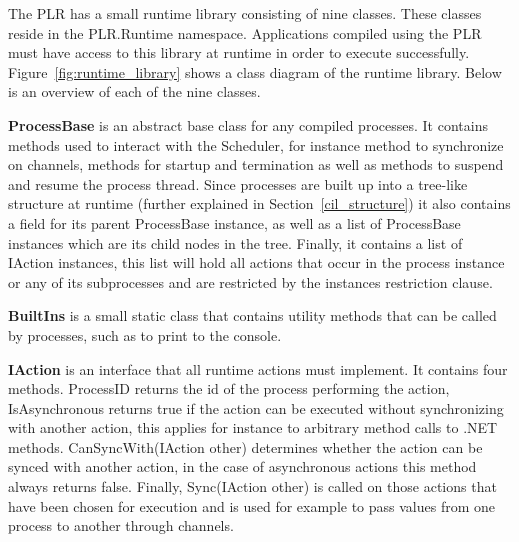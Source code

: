	The PLR has a small runtime library consisting of nine classes. These classes
	reside in the \textsf{PLR.Runtime} namespace. Applications
	compiled using the PLR must have access to this library at runtime in order
	to execute successfully. Figure~\ref{fig:runtime_library} shows a class 
	diagram of the runtime library. Below is an overview of each of the
	nine classes.

	\textbf{ProcessBase} is an abstract base class for any compiled processes.
	It contains methods used to interact with the \textsf{Scheduler},
	for instance method to synchronize on channels, methods for startup and
	termination as well as methods to suspend and resume the process thread.
	Since processes are built up into a tree-like structure at runtime (further 
	explained in Section~\ref{cil_structure}) it also contains a field for its 
	parent \textsf{ProcessBase} instance, as well as a list of 
	\textsf{ProcessBase} instances which are its child nodes in the tree. Finally, 
	it contains a list of \textsf{IAction} instances, this list will hold all 
	actions that occur in the process instance or any of its subprocesses and are 
	restricted by the instances restriction clause.
	
	\textbf{BuiltIns} is a small static class that contains utility methods
	that can be called by processes, such as to print to the console.
	
	\textbf{IAction} is an interface that all runtime actions must implement.
	It contains four methods. \textsf{ProcessID} returns the id of the
	process performing the action, \textsf{IsAsynchronous} returns true if
	the action can be executed without synchronizing with another action, 
	this applies for instance to arbitrary method calls to .NET methods.
	\textsf{CanSyncWith(IAction other)} determines whether the action can be 
	synced with another action, in the case of asynchronous actions this
	method always returns false. Finally, \textsf{Sync(IAction other)} is 
	called on those actions that have been chosen for execution and is used
	for example to pass values from one process to another through channels.

